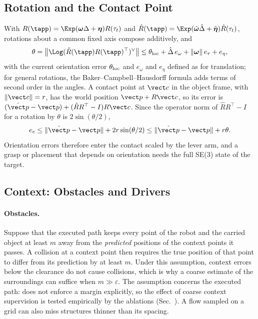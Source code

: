 \subsection{Rotation and the Contact Point}
\label{app:budget_rotation}
With $R(\tapp)=\Exp(\boldsymbol\omega\Delta+\boldsymbol\eta)R(\tau_t)$ and
$\hat R(\tapp)=\Exp(\hat{\boldsymbol\omega}\hat\Delta+\hat{\boldsymbol\eta})\hat R(\tau_t)$,
rotations about a common fixed axis compose additively, and
\begin{equation}
\theta=\big\|\Log(\hat R(\tapp)R(\tapp)^\top)^{\vee}\big\|
\le\theta_{\rm loc}+\hat\Delta\,e_\omega+\|\boldsymbol\omega\|\,e_\tau+e_\eta ,
\label{eq:budget_rotation}
\end{equation}
with the current orientation error $\theta_{\rm loc}$ and $e_\omega$ and $e_\eta$
defined as for translation; for general rotations, the Baker--Campbell--Hausdorff
formula adds terms of second order in the angles. A contact point at $\vect c$ in the
object frame, with $\|\vect c\|=r$, has the world position $\vect p+R\vect c$, so its
error is $(\hat{\vect p}-\vect p)+(\hat RR^\top-I)R\vect c$. Since the operator norm
of $\hat RR^\top-I$ for a rotation by $\theta$ is $2\sin(\theta/2)$,
\begin{equation}
e_{\rm c}\le\|\hat{\vect p}-\vect p\|+2r\sin(\theta/2)\le\|\hat{\vect p}-\vect p\|+r\theta .
\label{eq:contact_app}
\end{equation}
Orientation errors therefore enter the contact scaled by the lever arm, and a grasp
or placement that depends on orientation needs the full SE(3) state of the target.

\subsection{Context: Obstacles and Drivers}
\label{app:budget_context}
\paragraph{Obstacles.} Suppose that the executed path keeps every point of the robot and the carried object
at least $m$ away from the \emph{predicted} positions of the context points it
passes. A collision at a context point then requires the true position of that
point to differ from its prediction by at least $m$. Under this assumption, context
errors below the clearance do not cause collisions, which is why a coarse estimate
of the surroundings can suffice when $m\gg\varepsilon$. The assumption concerns the
executed path: \ours does not enforce a margin explicitly, so the effect of coarse
context supervision is tested empirically by the ablations
(Sec.~). A flow sampled on a grid can also miss structures
thinner than its spacing.

